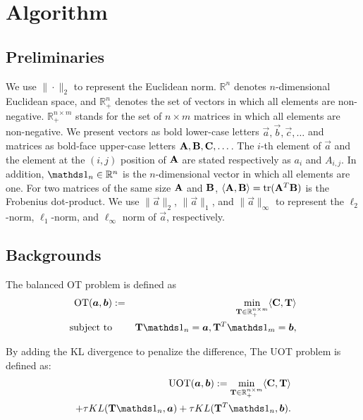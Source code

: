 \section{Algorithm}
\subsection{Preliminaries}
We use $\| \cdot \|_2$ to represent the Euclidean norm. $\mathbb{R}^n$ denotes $n$-dimensional Euclidean space, and $\mathbb{R}^n_+$ denotes the set of vectors in which all elements are non-negative. $\mathbb{R}^{n \times m}_+$ stands for the set of $n \times m$ matrices in which all elements are non-negative. We present vectors as bold lower-case letters $\vec{a},\vec{b},\vec{c},\dots$ and matrices as bold-face upper-case letters $\mathbf{A},\mathbf{B},\mathbf{C},\dots$. The $i$-th element of $\vec{a}$ and the element at the $(i,j)$ position of $\mathbf{A}$ are stated respectively as $a_i$ and ${A}_{i,j}$. In addition, $\one_n \in \mathbb{R}^n$ is the $n$-dimensional vector in which all elements are one.
For two matrices of the same size $\mathbf{A}$ and $\mathbf{B}$, $\langle \mathbf{A},\mathbf{B}\rangle={\rm tr}(\mathbf{A}^T\mathbf{B})$ is the Frobenius dot-product. We use $\|\vec{a}\|_2$, $\|\vec{a}\|_1$, and $\|\vec a\|_{\infty}$ to represent the $\ell_2$-norm, $\ell_1$-norm, and $\ell_{\infty}$ norm of $\vec{a}$, respectively.

\subsection{Backgrounds}
The balanced OT problem is defined as
\begin{eqnarray}
\label{Eq:Standard_OT}
\operatorname{OT}(\vec{a},\vec{b}) &:=& \min_{ \mat{T} \in \R_{+}^{n \times m}} \langle \mat{C}, \mat{T} \rangle \\
\text{subject\ to}&& \mat{T} \one_n= \vec{a}, \mat{T}^{T}\one_m = \vec{b}, \notag
\end{eqnarray}

By adding the KL divergence to penalize the difference, The UOT problem is defined as:
\begin{eqnarray}
\label{eq:uot}
\operatorname{UOT}(\vec{a},\vec{b}) := \min_{\mat{T} \in \R_{+}^{n \times m}} \langle \mat{C}, \mat{T} \rangle \\
+ \tau KL(\mat{T} \one_n,\vec{a}) + \tau KL(\mat{T}^{T} \one_n,\vec{b}).
\end{eqnarray}

